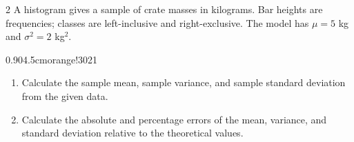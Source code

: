 \begin{multicols}{2}
A histogram gives a sample of crate masses in kilograms. Bar heights are
frequencies; classes are left-inclusive and right-exclusive. The model
has $\mu=5$ kg and $\sigma^2=2$ kg$^2$.
\begin{center}
{0.90\linewidth}{4.5cm}{orange!30}{2}{1}
\end{center}
\begin{enumerate}[label=\textbf{(\alph*)}]
\item Calculate the sample mean, sample variance, and sample standard deviation from the given data. 
\item Calculate the absolute and percentage errors of the mean, variance, and standard deviation relative to the theoretical values. 
\end{enumerate}

\end{multicols}

